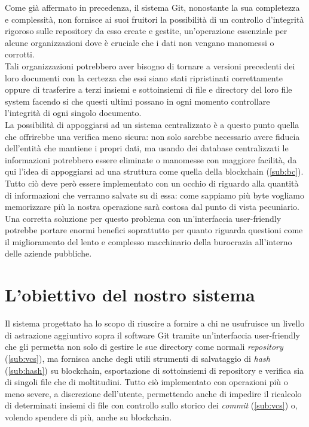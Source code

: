 
Come già affermato in precedenza, il sistema Git,
nonostante la sua completezza e complessità,
non fornisce ai suoi fruitori la possibilità di un controllo d'integrità rigoroso
sulle repository da esso create e gestite, un'operazione essenziale per
alcune organizzazioni dove è cruciale che i dati non vengano manomessi o corrotti. \\
Tali organizzazioni potrebbero aver bisogno di tornare a versioni precedenti
dei loro documenti con la certezza che essi siano stati ripristinati
correttamente oppure di trasferire a terzi insiemi e sottoinsiemi
di file e directory del loro file system facendo si che questi ultimi
possano in ogni momento controllare l'integrità di ogni singolo documento. \\
La possibilità di appoggiarsi ad un sistema centralizzato è a questo punto quella
che offrirebbe una verifica meno sicura: non solo sarebbe necessario avere fiducia
dell'entità che mantiene i propri dati, ma usando dei database centralizzati le informazioni
potrebbero essere eliminate o manomesse con maggiore facilità,
da qui l'idea di appoggiarsi ad una struttura come quella della blockchain (\autoref{sub:bc}).
Tutto ciò deve però essere implementato con un occhio di riguardo alla quantità
di informazioni che verranno salvate su di essa: come sappiamo più byte vogliamo
memorizzare più la nostra operazione sarà costosa dal punto di vista pecuniario.
Una corretta soluzione per questo problema con un'interfaccia user-friendly
potrebbe portare enormi benefici soprattutto per quanto riguarda questioni
come il miglioramento del lento e complesso macchinario della burocrazia
all'interno delle aziende pubbliche. 

\section{L'obiettivo del nostro sistema}

Il sistema progettato ha lo scopo di riuscire a fornire a chi ne usufruisce
un livello di astrazione aggiuntivo sopra il software Git tramite un'interfaccia
user-friendly che gli permetta non solo di gestire le sue directory come normali
\emph{repository} (\autoref{sub:vcs}), ma fornisca anche degli utili strumenti di
salvataggio di \emph{hash} (\autoref{sub:hash}) su blockchain, esportazione di sottoinsiemi di repository
e verifica sia di singoli file che di moltitudini.
Tutto ciò implementato con operazioni più o meno severe, a discrezione dell'utente,
permettendo anche di impedire il ricalcolo di determinati insiemi di file con controllo
sullo storico dei \emph{commit} (\autoref{sub:vcs}) o, volendo spendere di più, anche su blockchain.

